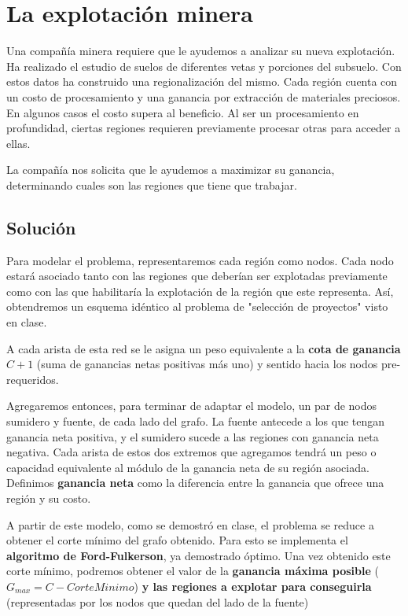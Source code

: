 \setlength{\parskip}{1em}

\section{La explotación minera}
Una compañía minera requiere que le ayudemos a analizar su nueva explotación. Ha realizado el estudio de suelos de diferentes vetas y porciones del subsuelo. Con estos datos ha construido una regionalización del mismo. Cada región cuenta con un costo de procesamiento y una ganancia por extracción de materiales preciosos. En algunos casos el costo supera al beneficio. Al ser un procesamiento en profundidad, ciertas regiones requieren previamente procesar otras para acceder a ellas. \par

La compañía nos solicita que le ayudemos a maximizar su ganancia, determinando cuales son las regiones que tiene que trabajar. \par

\subsection{Solución}
Para modelar el problema, representaremos cada región como nodos. Cada nodo estará asociado tanto con las regiones que deberían ser explotadas previamente como con las que habilitaría la explotación de la región que este representa. Así, obtendremos un esquema idéntico al problema de "selección de proyectos" visto en clase. \par

A cada arista de esta red se le asigna un peso equivalente a la \textbf{cota de ganancia ${C+ 1}$} (suma de ganancias netas positivas más uno) y sentido hacia los nodos pre-requeridos.\par

Agregaremos entonces, para terminar de adaptar el modelo, un par de nodos sumidero y fuente, de cada lado del grafo. La fuente antecede a los que tengan ganancia neta positiva, y el sumidero sucede a las regiones con ganancia neta negativa. Cada arista de estos dos extremos que agregamos tendrá un peso o capacidad equivalente al módulo de la ganancia neta de su región asociada. Definimos \textbf{ganancia neta} como la diferencia entre la ganancia que ofrece una región y su costo.\par

A partir de este modelo, como se demostró en clase, el problema se reduce a obtener el corte mínimo del grafo obtenido. Para esto se implementa el \textbf{algoritmo de Ford-Fulkerson}, ya demostrado óptimo. Una vez obtenido este corte mínimo, podremos obtener el valor de la \textbf{ganancia máxima posible} ($G_{max}=C-CorteMinimo$) \textbf{y las regiones a explotar para conseguirla} (representadas por los nodos que quedan del lado de la fuente) \par


